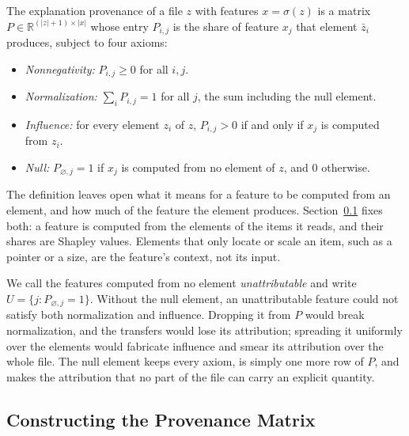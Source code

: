 \label{def:ExplanationProvenance}
{
The explanation provenance of a file $z$ with features $x = \sigma(z)$ is a matrix
$P \in \mathbb{R}^{(|z| + 1) \times |x|}$ whose entry $P_{i,j}$ is the share of feature $x_j$ that element $\bar{z}_i$
produces, subject to four axioms:
\begin{itemize}
    \item \textit{Nonnegativity:} $P_{i,j} \ge 0$ for all $i, j$.
    \item \textit{Normalization:} $\sum_i P_{i,j} = 1$ for all $j$, the sum including the null element.
    \item \textit{Influence:} for every element $z_i$ of $z$, $P_{i,j} > 0$ if and only if $x_j$ is computed from $z_i$.
    \item \textit{Null:} $P_{\varnothing,j} = 1$ if $x_j$ is computed from no element of $z$, and $0$ otherwise.
\end{itemize}
}

The definition leaves open what it means for a feature to be computed from an element, and how much of the feature
the element produces. Section~\ref{sec:XML:Constructing} fixes both: a feature is computed from the elements of the
items it reads, and their shares are Shapley values. Elements that only locate or scale an item, such as a pointer or a
size, are the feature's context, not its input.

We call the features computed from no element \emph{unattributable} and write $U = \{ j : P_{\varnothing,j} = 1 \}$.
Without the null element, an unattributable feature could not satisfy both normalization and influence. Dropping it
from $P$ would break normalization, and the transfers would lose its attribution; spreading it uniformly over the
elements would fabricate influence and smear its attribution over the whole file. The null element keeps every axiom,
is simply one more row of $P$, and makes the attribution that no part of the file can carry an explicit quantity.

\subsection{Constructing the Provenance Matrix}
\label{sec:XML:Constructing}

